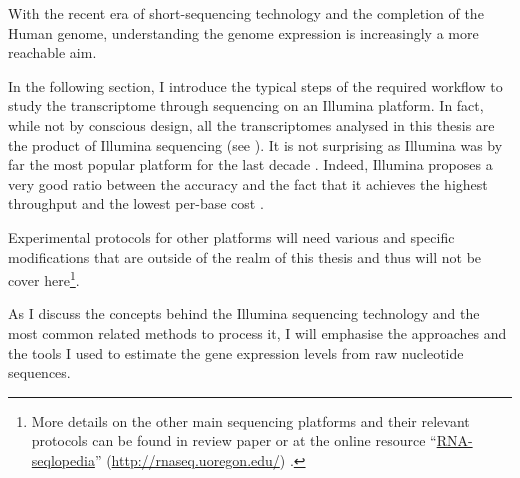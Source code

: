 With the recent era of short-sequencing technology and the completion of the
Human genome, understanding the genome expression is increasingly a more
reachable aim.

\begin{comment}
While microarrays are measuring many \mRNAs\ at once, their number is limited,

\TK{history of \Rnaseq.}
In the past decade, \gls{RNA-Seq} technology has risen as the method of choice
for  transcriptome.

Many methods and technologies through the years but more recently, boom of study:
next generation sequencing (1st generation, 2nd generation and 3rd)\ldots So
much that now the expression doesn't mean anything.

Completion of the Human genome project : key changer: probes with microarrays
possible (as there were then template). Next key changer: shotgun sequencing
instead of Sanger sequencing (slow). + advance in computer science: needs of
parallelisation and storage.

So, In 2008, shift from microarrays to \Rnaseq.

\clearpage

\end{comment}

In the following section, I introduce the typical steps of the required workflow
to study the transcriptome through sequencing on an Illumina platform. In fact,
while not by conscious design, all the transcriptomes analysed in this thesis are
the product of Illumina sequencing (see
).
It is not surprising as Illumina was by far
the most popular platform for the last decade .
Indeed, Illumina proposes a very
good ratio between the accuracy and the fact that it achieves the highest
throughput and the lowest per-base cost .

Experimental protocols for other platforms will need various and specific
modifications that are outside of the realm of this thesis and thus will not be
cover here\footnote{More details on the other main sequencing platforms and their
relevant protocols can be found in \cite{rnaseqProtocols} review paper or at the
online resource \enquote{\href{http://rnaseq.uoregon.edu/}{RNA-seqlopedia}}
(\href{http://rnaseq.uoregon.edu/}{http://rnaseq.uoregon.edu/})
.}.

As I discuss the concepts behind the Illumina sequencing technology and the
most common related methods to process it, I will emphasise the approaches and
the tools I used to estimate the gene expression levels from raw nucleotide
sequences.

